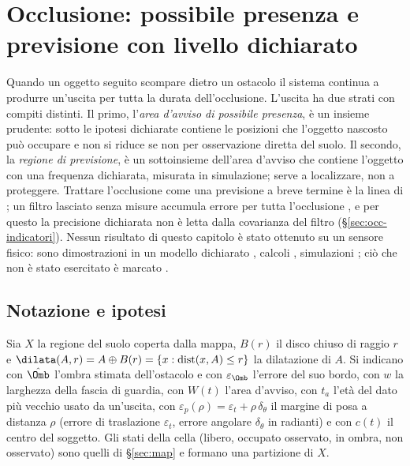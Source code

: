\section{Occlusione: possibile presenza e previsione con livello dichiarato}\label{sec:occ}

Quando un oggetto seguito scompare dietro un ostacolo il sistema continua a produrre un'uscita per tutta la durata dell'occlusione. L'uscita ha due strati con compiti distinti. Il primo, l'\emph{area d'avviso di possibile presenza}, è un insieme prudente: sotto le ipotesi dichiarate contiene le posizioni che l'oggetto nascosto può occupare e non si riduce se non per osservazione diretta del suolo. Il secondo, la \emph{regione di previsione}, è un sottoinsieme dell'area d'avviso che contiene l'oggetto con una frequenza dichiarata, misurata in simulazione; serve a localizzare, non a proteggere. Trattare l'occlusione come una previsione a breve termine è la linea di \cite{khurana2021}; un filtro lasciato senza misure accumula errore per tutta l'occlusione \cite{cao2023}, e per questo la precisione dichiarata non è letta dalla covarianza del filtro (\S\ref{sec:occ-indicatori}). Nessun risultato di questo capitolo è stato ottenuto su un sensore fisico: sono dimostrazioni in un modello dichiarato , calcoli , simulazioni ; ciò che non è stato esercitato è marcato .

\subsection{Notazione e ipotesi}\label{sec:occ-ipotesi}

Sia $X$ la regione del suolo coperta dalla mappa, $B(r)$ il disco chiuso di raggio $r$ e $\dilata(A,r)=A\oplus B(r)=\{x:\operatorname{dist}(x,A)\le r\}$ la dilatazione di $A$. Si indicano con $\hat\Omb$ l'ombra stimata dell'ostacolo e con $\varepsilon_\Omb$ l'errore del suo bordo, con $w$ la larghezza della fascia di guardia, con $W(t)$ l'area d'avviso, con $t_a$ l'età del dato più vecchio usato da un'uscita, con $\varepsilon_p(\rho)=\varepsilon_t+\rho\,\delta_\theta$ il margine di posa a distanza $\rho$ (errore di traslazione $\varepsilon_t$, errore angolare $\delta_\theta$ in radianti) e con $c(t)$ il centro del soggetto. Gli stati della cella (libero, occupato osservato, in ombra, non osservato) sono quelli di \S\ref{sec:map} e formano una partizione di $X$.

